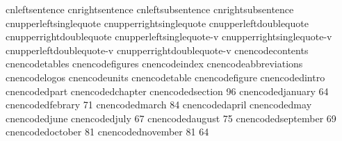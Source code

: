\startencoding[big5]
   cnleftsentence            {}
   cnrightsentence           {}
   cnleftsubsentence         {}
   cnrightsubsentence        {}
   cnupperleftsinglequote    {}
   cnupperrightsinglequote   {}
   cnupperleftdoublequote    {}
   cnupperrightdoublequote   {}
   cnupperleftsinglequote-v  {}
   cnupperrightsinglequote-v {}
   cnupperleftdoublequote-v  {}
   cnupperrightdoublequote-v {}
   cnencodecontents          {}
   cnencodetables            {}
   cnencodefigures           {}
   cnencodeindex             {}
   cnencodeabbreviations     {}
   cnencodelogos             {}
   cnencodeunits             {}
   cnencodetable             {}
   cnencodefigure            {}
   cnencodedintro            {}
   cnencodedpart             {}
   cnencodedchapter          {}
   cnencodedsection          { {96}}
   cnencodedjanuary          { {64}}
   cnencodedfebrary          { {71}}
   cnencodedmarch            { {84}}
   cnencodedapril            {}
   cnencodedmay              {}
   cnencodedjune             {}
   cnencodedjuly             { {67}}
   cnencodedaugust           { {75}}
   cnencodedseptember        { {69}}
   cnencodedoctober          { {81}}
   cnencodednovember         { {81} {64}}
